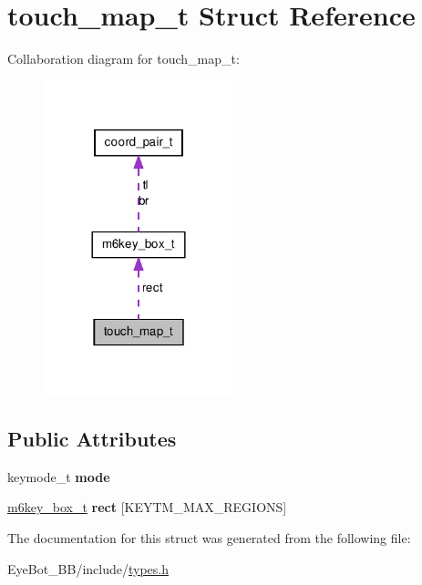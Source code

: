\hypertarget{structtouch__map__t}{\section{touch\-\_\-map\-\_\-t \-Struct \-Reference}
\label{structtouch__map__t}
}


\-Collaboration diagram for touch\-\_\-map\-\_\-t\-:\nopagebreak
\begin{figure}[H]
\begin{center}
\leavevmode
\includegraphics[width=156pt]{structtouch__map__t__coll__graph}
\end{center}
\end{figure}
\subsection*{\-Public \-Attributes}
\begin{DoxyCompactItemize}
\item 
\hypertarget{structtouch__map__t_af1672fbe1495630caa06f36208fcd255}{keymode\-\_\-t {\bfseries mode}}\label{structtouch__map__t_af1672fbe1495630caa06f36208fcd255}

\item 
\hypertarget{structtouch__map__t_a6a498de65c1f5ae3e4e018cc425788fc}{\hyperlink{structm6key__box__t}{m6key\-\_\-box\-\_\-t} {\bfseries rect} \mbox{[}\-K\-E\-Y\-T\-M\-\_\-\-M\-A\-X\-\_\-\-R\-E\-G\-I\-O\-N\-S\mbox{]}}\label{structtouch__map__t_a6a498de65c1f5ae3e4e018cc425788fc}

\end{DoxyCompactItemize}


\-The documentation for this struct was generated from the following file\-:\begin{DoxyCompactItemize}
\item 
\-Eye\-Bot\-\_\-\-B\-B/include/\hyperlink{types_8h}{types.\-h}\end{DoxyCompactItemize}
